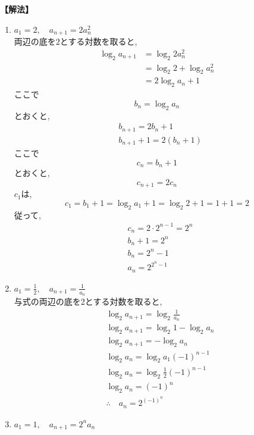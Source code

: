   \noindent\textbf{【解法】}
  \begin{enumerate}[label=(\arabic*),parsep=3pt]
    \item $\displaystyle a_1=2,\quad a_{n+1}=2a_n^2$\\
          両辺の底を$2$とする対数を取ると,
          \begin{align*}
            \log_2a_{n+1}
              &=\log_2{2a_n^2}\\
              &=\log_2{2}+\log_2{a_n^2}\\
              &=2\log_2{a_n}+1
          \end{align*}
          ここで
          \[
            b_n=\log_2a_n
          \]
          とおくと,
          \begin{align*}
            &b_{n+1}=2b_n+1\\
            &b_{n+1}+1=2(b_n+1)
          \end{align*}
          ここで
          \[
            c_n=b_n+1
          \]
          とおくと,
          \[
            c_{n+1}=2c_n
          \]
          $c_1$は,
          \[
            c_1=b_1+1=\log_2{a_1}+1=\log_2{2}+1=1+1=2
          \]
          従って,
          \begin{align*}
            &c_n=2\cdot2^{n-1}=2^n\\
            &b_n+1=2^n\\
            &b_n=2^n-1\\
            &a_n=2^{2^{n}-1}
          \end{align*}
    \item $\displaystyle a_1=\frac12,\quad a_{n+1}=\frac{1}{a_n}$\\
          与式の両辺の底を2とする対数を取ると,
          \begin{align*}
            &\log_2{a_{n+1}}=\log_2{\frac{1}{a_n}}\\
            &\log_2{a_{n+1}}=\log_2{1}-\log_2{a_n}\\
            &\log_2{a_{n+1}}=-\log_2{a_n}\\
            &\log_2{a_n}=\log_2{a_1}(-1)^{n-1}\\
            &\log_2{a_n}=\log_2{\frac{1}{2}}(-1)^{n-1}\\
            &\log_2{a_n}=(-1)^{n}\\
            &\therefore \quad a_n=2^{(-1)^{n}}
          \end{align*}
    \item $\displaystyle a_1=1,\quad a_{n+1}=2^na_n$\\

\end{enumerate}
